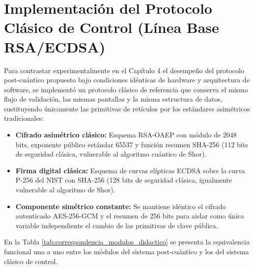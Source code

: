 \section{Implementación del Protocolo Clásico de Control (Línea Base RSA/ECDSA)}
\label{sec:implementacion_clasica}

Para contrastar experimentalmente en el Capítulo 4 el desempeño del protocolo post-cuántico propuesto bajo condiciones idénticas de hardware y arquitectura de software, se implementó un protocolo clásico de referencia que conserva el mismo flujo de validación, las mismas pantallas y la misma estructura de datos, sustituyendo únicamente las primitivas de retículos por los estándares asimétricos tradicionales:

\begin{itemize}
	\item \textbf{Cifrado asimétrico clásico:} Esquema RSA-OAEP con módulo de 2048 bits, exponente público estándar 65537 y función resumen SHA-256 (112 bits de seguridad clásica, vulnerable al algoritmo cuántico de Shor).
	\item \textbf{Firma digital clásica:} Esquema de curvas elípticas ECDSA sobre la curva P-256 del NIST con SHA-256 (128 bits de seguridad clásica, igualmente vulnerable al algoritmo de Shor).
	\item \textbf{Componente simétrico constante:} Se mantiene idéntico el cifrado autenticado AES-256-GCM y el resumen de 256 bits para aislar como única variable independiente el cambio de las primitivas de clave pública.
\end{itemize}

En la Tabla \ref{tab:correspondencia_modulos_didactico} se presenta la equivalencia funcional uno a uno entre los módulos del sistema post-cuántico y los del sistema clásico de control.

